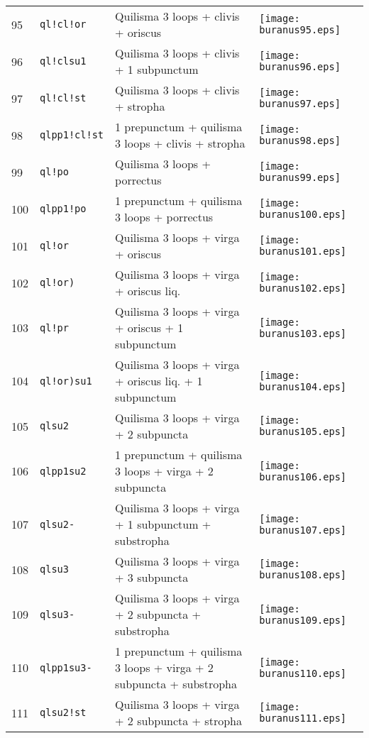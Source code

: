 \documentclass{scrarticle}
\begin{document}
\begin{longtable}{l|l|l|l}
95 & \texttt{ql!cl!or} & Quilisma 3 loops + clivis + oriscus & \texttt{[image: buranus95.eps]} \\
96 & \texttt{ql!clsu1} & Quilisma 3 loops + clivis + 1 subpunctum & \texttt{[image: buranus96.eps]} \\
97 & \texttt{ql!cl!st} & Quilisma 3 loops + clivis + stropha & \texttt{[image: buranus97.eps]} \\
98 & \texttt{qlpp1!cl!st} & 1 prepunctum + quilisma 3 loops + clivis + stropha & \texttt{[image: buranus98.eps]} \\
99 & \texttt{ql!po} & Quilisma 3 loops + porrectus & \texttt{[image: buranus99.eps]} \\
100 & \texttt{qlpp1!po} & 1 prepunctum + quilisma 3 loops + porrectus & \texttt{[image: buranus100.eps]} \\
101 & \texttt{ql!or} & Quilisma 3 loops + virga + oriscus & \texttt{[image: buranus101.eps]} \\
102 & \texttt{ql!or)} & Quilisma 3 loops + virga + oriscus liq. & \texttt{[image: buranus102.eps]} \\
103 & \texttt{ql!pr} & Quilisma 3 loops + virga + oriscus + 1 subpunctum & \texttt{[image: buranus103.eps]} \\
104 & \texttt{ql!or)su1} & Quilisma 3 loops + virga + oriscus liq. + 1 subpunctum & \texttt{[image: buranus104.eps]} \\
105 & \texttt{qlsu2} & Quilisma 3 loops + virga + 2 subpuncta & \texttt{[image: buranus105.eps]} \\
106 & \texttt{qlpp1su2} & 1 prepunctum + quilisma 3 loops + virga + 2 subpuncta & \texttt{[image: buranus106.eps]} \\
107 & \texttt{qlsu2-} & Quilisma 3 loops + virga + 1 subpunctum + substropha & \texttt{[image: buranus107.eps]} \\
108 & \texttt{qlsu3} & Quilisma 3 loops + virga + 3 subpuncta & \texttt{[image: buranus108.eps]} \\
109 & \texttt{qlsu3-} & Quilisma 3 loops + virga + 2 subpuncta + substropha & \texttt{[image: buranus109.eps]} \\
110 & \texttt{qlpp1su3-} & 1 prepunctum + quilisma 3 loops + virga + 2 subpuncta + substropha & \texttt{[image: buranus110.eps]} \\
111 & \texttt{qlsu2!st} & Quilisma 3 loops + virga + 2 subpuncta + stropha & \texttt{[image: buranus111.eps]} \\

\end{longtable}
\end{document}

